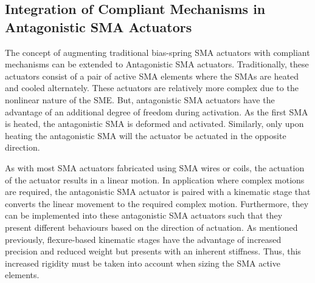 \subsection{Integration of Compliant Mechanisms in Antagonistic SMA Actuators}\label{subsec:design-methodology-antagonistic}

The concept of augmenting traditional bias-spring SMA actuators with compliant mechanisms can be extended to Antagonistic SMA actuators. Traditionally, these actuators consist of a pair of active SMA elements where the SMAs are heated and cooled alternately. These actuators are relatively more complex due to the nonlinear nature of the SME. But, antagonistic SMA actuators have the advantage of an additional degree of freedom during activation. As the first SMA is heated, the antagonistic SMA is deformed and activated. Similarly, only upon heating the antagonistic SMA will the actuator be actuated in the opposite direction.

As with most SMA actuators fabricated using SMA wires or coils, the actuation of the actuator results in a linear motion. In application where complex motions are required, the antagonistic SMA actuator is paired with a kinematic stage that converts the linear movement to the required complex motion. Furthermore, they can be implemented into these antagonistic SMA actuators such that they present different behaviours based on the direction of actuation. As mentioned previously, flexure-based kinematic stages have the advantage of increased precision and reduced weight but presents with an inherent stiffness. Thus, this increased rigidity must be taken into account when sizing the SMA active elements.

